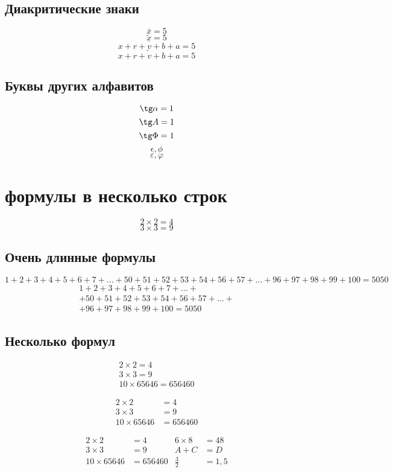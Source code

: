 \documentclass[a4paper,12pt,leqno]{article} %
\begin{document}
\subsection{Диакритические знаки}
\[\bar x = 5\]
\[\tilde x=5\]
\[\overline{x+r+v+b+a}=5\]
\[\widetilde{x+r+v+b+a}=5\]

\subsection{Буквы других алфавитов}
\[\tg \alpha = 1 \]
\[\tg A = 1 \]
\[\tg \Phi = 1 \]
\[\epsilon, \phi\]
\[\varepsilon, \varphi\]

\section{формулы в несколько строк}
\[2\times2=4\]
\[3\times3=9\]
\subsection{Очень длинные формулы}
\[
1+2+3+4+5+6+7+\dots+50+51+52+53+54+56+57+\dots+96+97+98+99+100=5050
\]
\begin{multline}
1+2+3+4+5+6+7+\dots+ \\ +50+51+52+53+54+56+57+\dots +\\ +96+97+98+99+100=5050\tag{S}\label{eq:sum}
\end{multline}

\subsection{Несколько формул}

\begin{align}
2\times 2=4\\
3\times 3=9\\
10\times 65646 = 656460
\end{align}

\begin{align*}
2\times 2&=4\\
3\times 3&=9\\
10\times 65646 &= 656460
\end{align*}

\begin{align*}
2\times 2&=4 & 6\times 8 &=48\\
3\times 3&=9 & A+C&=D\\
10\times 65646 &= 656460 & \frac{3}{2}&=1,5
\end{align*}
\end{document}
